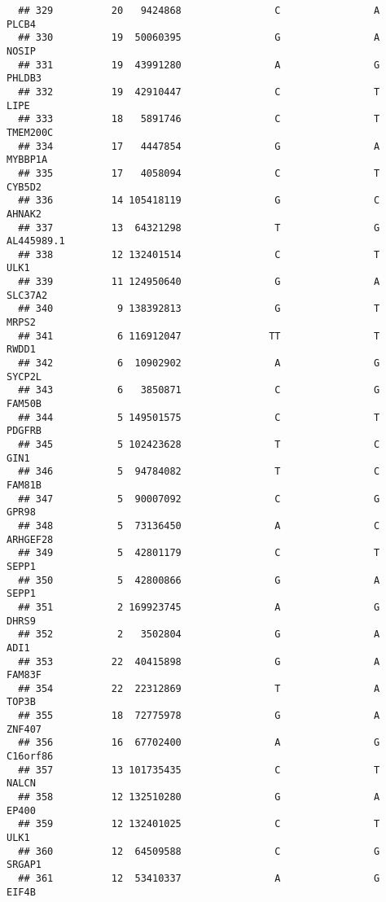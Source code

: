 \documentclass[12pt,twoside]{reedthesis}
\theoremstyle{definition}
\theoremstyle{definition}
\theoremstyle{remark}
\begin{document}
\begin{verbatim}
  ## 329          20   9424868                C                A          PLCB4
  ## 330          19  50060395                G                A          NOSIP
  ## 331          19  43991280                A                G         PHLDB3
  ## 332          19  42910447                C                T           LIPE
  ## 333          18   5891746                C                T       TMEM200C
  ## 334          17   4447854                G                A        MYBBP1A
  ## 335          17   4058094                C                T         CYB5D2
  ## 336          14 105418119                G                C         AHNAK2
  ## 337          13  64321298                T                G     AL445989.1
  ## 338          12 132401514                C                T           ULK1
  ## 339          11 124950640                G                A        SLC37A2
  ## 340           9 138392813                G                T          MRPS2
  ## 341           6 116912047               TT                T          RWDD1
  ## 342           6  10902902                A                G         SYCP2L
  ## 343           6   3850871                C                G         FAM50B
  ## 344           5 149501575                C                T         PDGFRB
  ## 345           5 102423628                T                C           GIN1
  ## 346           5  94784082                T                C         FAM81B
  ## 347           5  90007092                C                G          GPR98
  ## 348           5  73136450                A                C       ARHGEF28
  ## 349           5  42801179                C                T          SEPP1
  ## 350           5  42800866                G                A          SEPP1
  ## 351           2 169923745                A                G          DHRS9
  ## 352           2   3502804                G                A           ADI1
  ## 353          22  40415898                G                A         FAM83F
  ## 354          22  22312869                T                A          TOP3B
  ## 355          18  72775978                G                A         ZNF407
  ## 356          16  67702400                A                G       C16orf86
  ## 357          13 101735435                C                T          NALCN
  ## 358          12 132510280                G                A          EP400
  ## 359          12 132401025                C                T           ULK1
  ## 360          12  64509588                C                G         SRGAP1
  ## 361          12  53410337                A                G          EIF4B

\end{verbatim}
\end{document}
